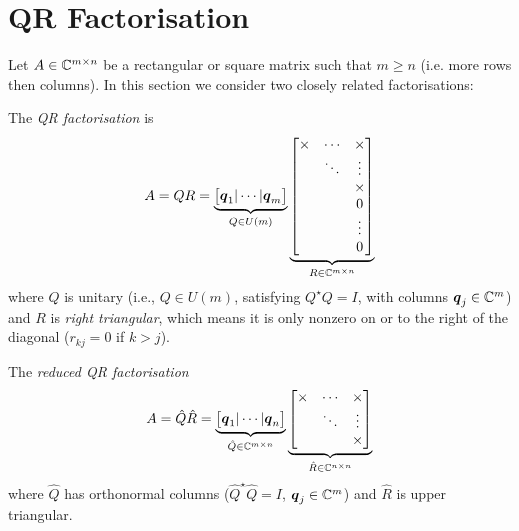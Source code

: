 
\section{QR Factorisation}
Let $A \in {\mathbb C}^{m \times n}$ be a rectangular or square matrix such that $m \ensuremath{\geq} n$ (i.e. more rows then columns). In this section we consider two closely related factorisations:

\begin{definition}[QR factorisation] The \emph{QR factorisation} is
\[
A = Q R = \underbrace{\begin{bmatrix} \ensuremath{\bm{\q}}_1 | \ensuremath{\cdots} | \ensuremath{\bm{\q}}_m \end{bmatrix}}_{Q \ensuremath{\in} U(m)} \underbrace{\begin{bmatrix} \ensuremath{\times} & \ensuremath{\cdots} & \ensuremath{\times} \\ & \ensuremath{\ddots} & \ensuremath{\vdots} \\ && \ensuremath{\times} \\ &&0 \\ &&\ensuremath{\vdots} \\ && 0 \end{bmatrix}}_{R \ensuremath{\in} \ensuremath{\bbC}^{m \ensuremath{\times} n}}
\]
where $Q$ is unitary (i.e., $Q \ensuremath{\in} U(m)$, satisfying $Q^\ensuremath{\star}Q = I$, with columns $\bm{{\mbox{\boldmath$q$\unboldmath}}}_j \in {\mathbb C}^m$) and $R$ is \emph{right triangular}, which means it  is only nonzero on or to the right of the diagonal ($r_{kj} = 0$ if $k > j$). \end{definition}

\begin{definition} The \emph{reduced QR factorisation}
\[
A = \hat Q \hat R = \underbrace{\begin{bmatrix} \ensuremath{\bm{\q}}_1 | \ensuremath{\cdots} | \ensuremath{\bm{\q}}_n \end{bmatrix}}_{ \hat Q \ensuremath{\in} \ensuremath{\bbC}^{m \ensuremath{\times} n}} \underbrace{\begin{bmatrix} \ensuremath{\times} & \ensuremath{\cdots} & \ensuremath{\times} \\ & \ensuremath{\ddots} & \ensuremath{\vdots} \\ && \ensuremath{\times}  \end{bmatrix}}_{\hat R \ensuremath{\in} \ensuremath{\bbC}^{n \ensuremath{\times} n}}
\]
where $\hat Q$ has orthonormal columns ($\hat Q^\ensuremath{\star} \hat Q = I$, $\bm{{\mbox{\boldmath$q$\unboldmath}}}_j \in {\mathbb C}^m$) and $\hat R$ is upper triangular. \end{definition}

